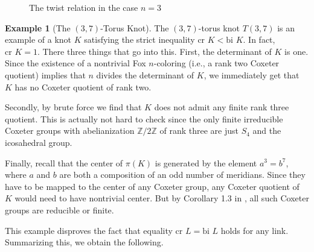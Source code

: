 \documentclass[a4paper]{article}
\theoremstyle{definition}
\newtheorem{example}[theorem]{Example}
\begin{document}
\begin{figure}[ht]
\centering
{}
\caption{The twist relation in the case $n = 3$}
\label{fig:twist-relations}
\end{figure}

\begin{example}[The $(3, 7)$-Torus Knot]
The $(3, 7)$-torus knot $T(3,7)$ is an example of a knot $K$ satisfying the strict inequality $\text{cr } K < \text{bi } K$. In fact, $\text{cr } K = 1$. There three things that go into this. First, the determinant of $K$ is one. Since the existence of a nontrivial Fox $n$-coloring (i.e., a rank two Coxeter quotient) implies that $n$ divides the determinant of $K$, we immediately get that $K$ has no Coxeter quotient of rank two.

Secondly, by brute force we find that $K$ does not admit any finite rank three quotient. This is actually not hard to check since the only finite irreducible Coxeter groups with abelianization $\mathbb{Z}/2\mathbb{Z}$ of rank three are just $S_4$ and the icosahedral group.

Finally, recall that the center of $\pi(K)$ is generated by the element $a^3 = b^7$, where $a$ and $b$ are both a composition of an odd number of meridians. Since they have to be mapped to the center of any Coxeter group, any Coxeter quotient of $K$ would need to have nontrivial center. But by Corollary 1.3 in \cite{hosaka2005}, all such Coxeter groups are reducible or finite.
\end{example}

This example disproves the fact that equality $\text{cr } L = \text{bi } L$ holds for any link. Summarizing this, we obtain the following.
\end{document}
